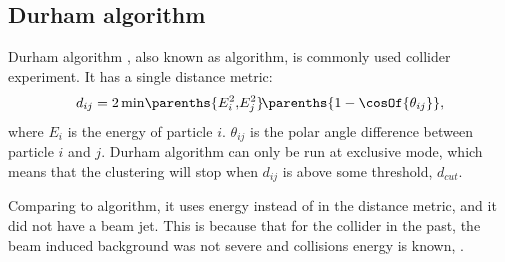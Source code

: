 \subsection{Durham algorithm}

Durham algorithm \cite{Catani:1991hj}, also known as \ee \kt algorithm, is commonly used \ee collider experiment. It has a single distance metric:
\begin{equation}
d_{ij} = 2\min\!\parenths{E_i^2,\!E_j^2}\!\parenths{1 - \cosOf{\theta_{ij}}},
\end{equation}
where $E_i$ is the energy of particle $i$. $\theta_{ij}$ is the polar angle difference between particle $i$ and $j$. Durham algorithm can only be run at exclusive mode, which means that the clustering will stop when $d_{ij}$ is above some threshold, $d_{cut}$.

Comparing to \kt algorithm, it uses energy instead of \pT in the distance metric, and it did not have a beam jet. This is because that for the \ee collider in the past, the beam induced background was not severe and collisions energy is known, \sqrtS.

